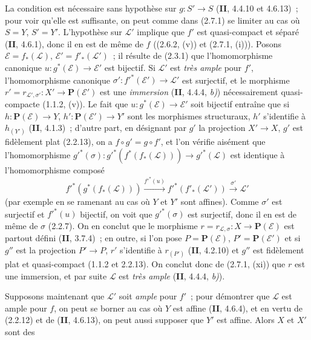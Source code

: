 La condition est nécessaire sans hypothèse sur $g:S'\to S$ (\textbf{II}, 4.4.10 et
4.6.13)~; pour voir qu'elle est suffisante, on peut comme dans (2.7.1) se
limiter au cas où $S=Y$, $S'=Y'$. L'hypothèse sur $\mathcal L'$ implique que
$f'$ est quasi-compact et séparé (\textbf{II}, 4.6.1), donc il en est de même de $f$
((2.6.2, (v)) et (2.7.1, (i))). Posons
$\mathcal E=f_*(\mathcal L)$, $\mathcal E'=f'_*(\mathcal L')$~; il résulte
de (2.3.1) que l'homomorphisme canonique
$u:g^*(\mathcal E)\to\mathcal E'$ est bijectif. Si $\mathcal L'$ est \emph{très
ample} pour $f'$, l'homomorphisme canonique
$\sigma':f'^*(\mathcal E')\to\mathcal L'$ est surjectif, et le morphisme
$r'=r_{\mathcal L',\sigma'}:X'\to\mathbf P(\mathcal E')$
est une \emph{immersion} (\textbf{II}, 4.4.4, \emph{b)}) nécessairement quasi-compacte (1.1.2,
(v)). Le fait que $u:g^*(\mathcal E)\to\mathcal E'$ soit bijectif entraîne
que si $h:\mathbf P(\mathcal E)\to Y$, $h':\mathbf P(\mathcal E')\to Y'$
sont les morphismes structuraux, $h'$ s'identifie à $h_{(Y')}$ (\textbf{II}, 4.1.3)~;
d'autre part, en désignant par $g'$ la projection $X'\to X$, $g'$ est
fidèlement plat (2.2.13), on a $f\circ g'=g\circ f'$, et l'on vérifie
aisément que l'homomorphisme
$g'^*(\sigma):g'^*(f^*(f_*(\mathcal L)))\to g'^*(\mathcal L)$
est identique à l'homomorphisme composé
\[
f'^*(g^*(f_*(\mathcal L)))\xrightarrow{f'^*(u)}
f'^*(f'_*(\mathcal L'))\xrightarrow{\sigma'}\mathcal L'
\]
(par exemple en se ramenant au cas où $Y$ et $Y'$ sont affines). Comme
$\sigma'$ est surjectif et $f'^*(u)$ bijectif, on voit que
$g'^*(\sigma)$ est surjectif, donc il en est de même de $\sigma$ (2.2.7).
On en conclut que le morphisme
$r=r_{\mathcal L,\sigma}:X\to\mathbf P(\mathcal E)$ est partout défini
(\textbf{II}, 3.7.4)~; en outre, si l'on pose $P=\mathbf P(\mathcal E)$,
$P'=\mathbf P(\mathcal E')$ et si $g''$ est la projection $P'\to P$, $r'$
s'identifie à $r_{(P')}$ (\textbf{II}, 4.2.10) et $g''$ est fidèlement plat et
quasi-compact (1.1.2 et 2.2.13). On conclut donc de (2.7.1, (xi)) que $r$ est
une immersion, et par suite $\mathcal L$ est \emph{très ample} (\textbf{II}, 4.4.4, \emph{b)}).

Supposons maintenant que $\mathcal L'$ soit \emph{ample} pour $f'$~; pour démontrer
que $\mathcal L$ est ample pour $f$, on peut se borner au cas où $Y$ est
affine (\textbf{II}, 4.6.4), et en vertu de (2.2.12) et de (\textbf{II}, 4.6.13), on peut aussi
supposer que $Y'$ est affine. Alors $X$ et $X'$ sont des

